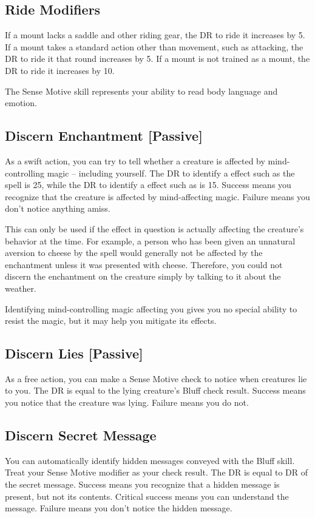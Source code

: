     \subsection{Ride Modifiers}\label{Ride Modifiers}
        If a mount lacks a saddle and other riding gear, the DR to ride it increases by 5. If a mount takes a standard action other than movement, such as attacking, the DR to ride it that round increases by 5. If a mount is not trained as a mount, the DR to ride it increases by 10.

        The Sense Motive skill represents your ability to read body language and emotion.

    \subsection{Discern Enchantment [Passive]}
        As a swift action, you can try to tell whether a creature is affected by mind-controlling magic -- including yourself. The DR to identify a  effect such as the  spell is 25, while the DR to identify a  effect such as  is 15. Success means you recognize that the creature is affected by mind-affecting magic. Failure means you don't notice anything amiss.

        This can only be used if the effect in question is actually affecting the creature's behavior at the time. For example, a person who has been given an unnatural aversion to cheese by the  spell would generally not be affected by the enchantment unless it was presented with cheese. Therefore, you could not discern the enchantment on the creature simply by talking to it about the weather.

        Identifying mind-controlling magic affecting you gives you no special ability to resist the magic, but it may help you mitigate its effects.

    \subsection{Discern Lies [Passive]}
        As a free action, you can make a Sense Motive check to notice when creatures lie to you. The DR is equal to the lying creature's Bluff check result. Success means you notice that the creature was lying. Failure means you do not.

    \subsection{Discern Secret Message}
        You can automatically identify hidden messages conveyed with the Bluff skill. Treat your Sense Motive modifier as your check result. The DR is equal to DR of the secret message. Success means you recognize that a hidden message is present, but not its contents. Critical success means you can understand the message. Failure means you don't notice the hidden message.

